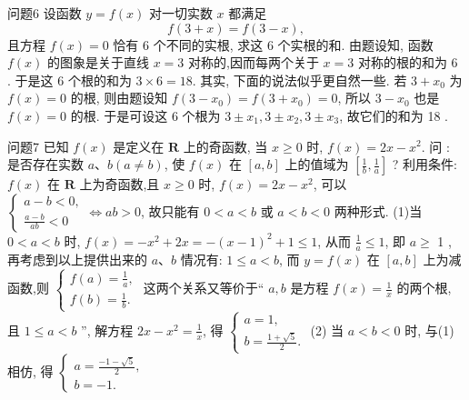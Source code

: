 问题6 设函数 $y=f(x)$ 对一切实数 $x$ 都满足
$$
f(3+x)=f(3-x),
$$
且方程 $f(x)=0$ 恰有 6 个不同的实根, 求这 6 个实根的和.
由题设知, 函数 $f(x)$ 的图象是关于直线 $x=3$ 对称的,因而每两个关于 $x=3$ 对称的根的和为 6 . 于是这 6 个根的和为 $3 \times 6=18$. 其实, 下面的说法似乎更自然一些.
若 $3+x_0$ 为 $f(x)=0$ 的根, 则由题设知 $f\left(3-x_0\right)=f\left(3+x_0\right)=0$, 所以 $3-x_0$ 也是 $f(x)=0$ 的根.
于是可设这 6 个根为 $3 \pm x_1, 3 \pm x_2, 3 \pm x_3$, 故它们的和为 18 .



问题7 已知 $f(x)$ 是定义在 $\mathbf{R}$ 上的奇函数, 当 $x \geqslant 0$ 时, $f(x)=2 x-x^2$. 问 : 是否存在实数 $a 、 b(a \neq b)$, 使 $f(x)$ 在 $[a, b]$ 上的值域为 $\left[\frac{1}{b}, \frac{1}{a}\right]$ ?
利用条件: $f(x)$ 在 $\mathbf{R}$ 上为奇函数,且 $x \geqslant 0$ 时, $f(x)=2 x-x^2$, 可以 $\left\{\begin{array}{l}a-b<0, \\ \frac{a-b}{a b}<0\end{array} \Leftrightarrow a b>0\right.$, 故只能有 $0<a<b$ 或 $a<b<0$ 两种形式.
(1)当 $0<a<b$ 时, $f(x)=-x^2+2 x=-(x-1)^2+1 \leqslant 1$, 从而 $\frac{1}{a} \leqslant 1$, 即 $a \geqslant$ 1 , 再考虑到以上提供出来的 $a 、 b$ 情况有: $1 \leqslant a<b$, 而 $y=f(x)$ 在 $[a, b]$ 上为减函数,则 $\left\{\begin{array}{l}f(a)=\frac{1}{a}, \\ f(b)=\frac{1}{b} .\end{array}\right.$ 这两个关系又等价于“ $a, b$ 是方程 $f(x)=\frac{1}{x}$ 的两个根, 且 $1 \leqslant a<b$ ”, 解方程 $2 x-x^2=\frac{1}{x}$, 得 $\left\{\begin{array}{l}a=1, \\ b=\frac{1+\sqrt{5}}{2} .\end{array}\right.$ 
(2) 当 $a< b<0$ 时, 与(1)相仿, 得 $\left\{\begin{array}{l}a=\frac{-1-\sqrt{5}}{2}, \\ b=-1 .\end{array}\right.$



